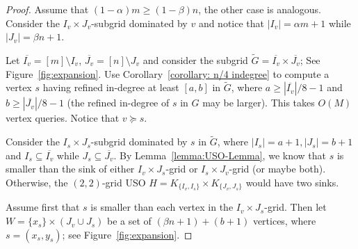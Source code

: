 \documentclass[a4paper,10pt]{article}
\newcommand{\indegree}{refined in-degree\xspace}
\begin{document}
\begin{proof}
Assume that $(1-\alpha) m \geq (1-\beta)n$, the other case is analogous. Consider the  $I_v\times J_v$-subgrid dominated by $v$ and 
notice that $|I_v| = \alpha m + 1$ while $|J_v| = \beta n + 1$. 

Let $\overline{I_v} = [m]\setminus I_v$, $\overline{J_v} = [n]\setminus J_v$ and consider the subgrid $\widetilde{G} = \overline{I_v} \times \overline{J_v}$; See Figure~\ref{fig:expansion}. 
Use Corollary~\ref{corollary: n/4 indegree} to compute a vertex $s$ having \indegree at least $[a,b]$ in $\widetilde{G}$, where $a \geq |\overline{I_v}|/8 - 1$ and $b \geq |\overline{J_v}|/8 - 1$ (the \indegree of $s$ in $G$ may be larger). This takes $O(M)$ vertex queries. Notice that $v \succeq s$.

Consider the $I_{s}\times J_{s}$-subgrid dominated by $s$ in $\widetilde{G}$, 
where $|I_{s}| = a + 1, |J_{s}| = b + 1$ and 
$I_{s}\subseteq \overline{I_v}$ while $J_{s}\subseteq \overline{J_v}$. 
By Lemma~\ref{lemma:USO-Lemma}, 
we know that $s$ is smaller than the sink of either
$I_v\times J_{s}$-grid or $I_{s}\times J_v$-grid (or maybe both).
Otherwise, the $(2,2)$-grid USO $H = K_{\{I_v, I_s\}}\times K_{\{J_v, J_s\}}$ would have two sinks.

Assume first that $s$ is smaller than each vertex in the $I_v\times J_{s}$-grid. Then let $W =  \{x_{s}\} \times (J_v\cup J_{s})$ be a set of $(\beta n + 1) + (b + 1)$ vertices, where $s = (x_{s}, y_{s})$; see Figure~\ref{fig:expansion}. 


\end{proof}
\end{document}
